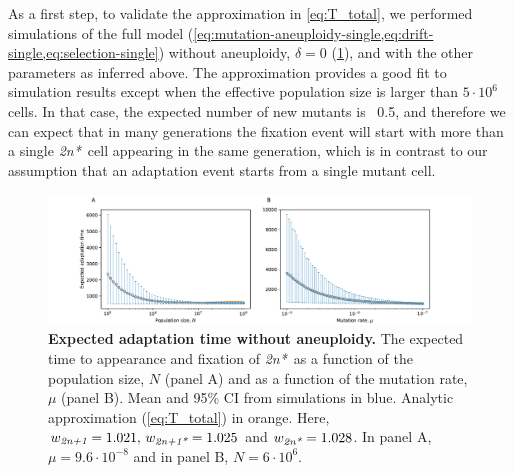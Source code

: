 \documentclass[12pt]{extarticle}
\newcommand{\anwt}{\emph{2n+1}}
\newcommand{\eumt}{\emph{2n*}}
\newcommand{\anmt}{\emph{2n+1*}}
\begin{document}
As a first step, to validate the approximation in \cref{eq:T_total}, we performed simulations of the full model (\cref{eq:mutation-aneuploidy-single,eq:drift-single,eq:selection-single})  without aneuploidy, $\delta=0$ (\cref{fig:only mut}), and with the other parameters as inferred above. The approximation provides a good fit to simulation results except when the effective population size is larger than $5\cdot 10^6$ cells. In that case, the expected number of new mutants is ~0.5, and therefore we can expect that in many generations the fixation event will start with more than a single \eumt\ cell appearing in the same generation, which is in contrast to our assumption that an adaptation event starts from a single mutant cell.


 \begin{figure}[h!]
 \centering
 \includegraphics[width=\textwidth]{../figures/figgrid_noaneu.pdf}
 \caption{\textbf{Expected adaptation time without aneuploidy.}
  The expected time to appearance and fixation of \eumt\ as a function of the population size, $N$ (panel A) and as a function of the mutation rate, $\mu$ (panel B). Mean and 95\% CI from simulations in blue. Analytic approximation (\cref{eq:T_total}) in orange. Here, $w_\anwt=1.021,\,   w_\anmt=1.025$ and $w_\eumt=1.028$. In panel A, $\mu=9.6\cdot 10^{-8}$ and in panel B, $N=6\cdot 10^6$.
  }
 \label{fig:only mut}
 \end{figure}
 
\end{document}
